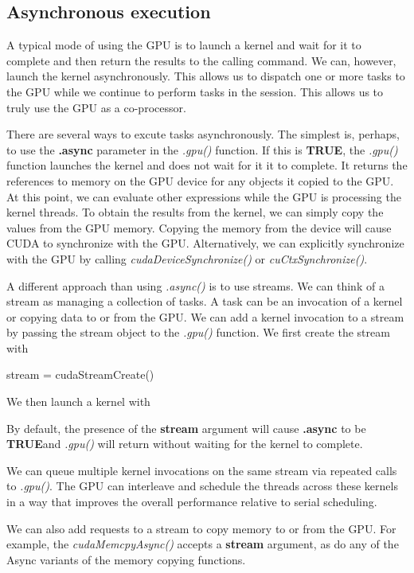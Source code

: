 \documentclass[article]{jss}
\def\Rtrue{\textbf{TRUE}}
\def\R{\proglang{R}}
\def\Rfunc#1{\textsl{#1()}}
\def\Rarg#1{\textbf{#1}}
\begin{document}
\subsection{Asynchronous execution}
A typical mode of using the GPU is to launch a kernel and wait for it
to complete and then return the results to the \R{} calling command.
We can, however, launch the kernel asynchronously.  This allows us to
dispatch one or more tasks to the GPU while we continue to perform
tasks in the \R{} session.  This allows us to truly use the GPU as a
co-processor.

There are several ways to excute tasks asynchronously.  The simplest
is, perhaps, to use the \Rarg{.async} parameter in the \Rfunc{.gpu}
function.  If this is \Rtrue, the \Rfunc{.gpu} function launches the
kernel and does not wait for it it to complete.  It returns the
references to memory on the GPU device for any objects it copied to
the GPU.  At this point, we can evaluate other \R{} expressions while
the GPU is processing the kernel threads.  To obtain the results from
the kernel, we can simply copy the values from the GPU memory.
Copying the memory from the device will cause CUDA to synchronize with
the GPU.  Alternatively, we can explicitly synchronize with the GPU by
calling \Rfunc{cudaDeviceSynchronize} or \Rfunc{cuCtxSynchronize}.

A different approach than using \Rfunc{.async} is to use streams.  We
can think of a stream as managing a collection of tasks. A task can be
an invocation of a kernel or copying data to or from the GPU.  We can
add a kernel invocation to a stream by passing the stream object to
the \Rfunc{.gpu} function.
We first create the stream with
\begin{RCode}
stream = cudaStreamCreate()
\end{RCode}
We then launch a kernel with
By default, the presence of the \Rarg{stream} argument
will cause \Rarg{.async} to be \Rtrue and 
\Rfunc{.gpu} will return without waiting for the kernel
to complete.

We can queue multiple kernel invocations on the same stream via
repeated calls to \Rfunc{.gpu}.  The GPU can interleave and schedule
the threads across these kernels in a way that improves the overall
performance relative to serial scheduling.

We can also add requests to a stream to copy memory to or from the
GPU.  For example, the \Rfunc{cudaMemcpyAsync} accepts a \Rarg{stream}
argument, as do any of the Async variants of the memory copying
functions.
\end{document}
